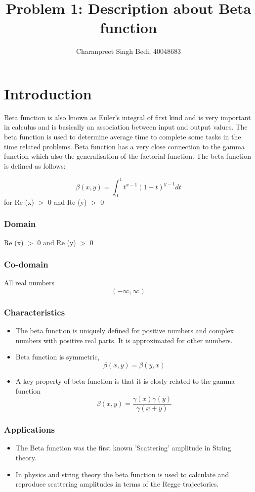 \documentclass[10pt]{article}
\title{Problem 1: Description about Beta function}
\author{Charanpreet Singh Bedi, 40048683}
\date{}
\begin{document}
\maketitle


\section*{Introduction}
Beta function is also known as Euler's integral of first kind and is very important in calculus and is basically an association between input and output values. The beta function is used to determine average time to complete some tasks in the time related problems. Beta function has a very close connection to the gamma function which also the generalisation of the factorial function. The beta function is defined as follows: 


    $$\beta(x,y) =\int_{0}^{1} t^{x-1} (1-t)^{y-1} dt$$
    for Re (x) $>$ 0 and Re (y) $>$ 0
    
\subsubsection*{Domain}
Re (x) $>$ 0 and Re (y) $>$ 0

\subsubsection*{Co-domain}
All real numbers \[ (-\infty,\infty )\]

\subsubsection*{Characteristics}
\begin{itemize}
    \item The beta function is uniquely defined for positive numbers and complex numbers with positive real parts. It is approximated for other numbers.
    \item Beta function is symmetric,$$ \beta(x,y) = \beta(y,x)$$
    \item A key property of beta function is that it is closly related to the gamma function
    $$\beta(x,y) = \frac{\gamma(x)\gamma(y)}{\gamma(x+y)}$$
\end{itemize}

\subsubsection*{Applications}
\begin{itemize}
    \item The Beta function was the first known 'Scattering' amplitude in String theory.
    \item In physics and string theory the beta function is used to calculate and reproduce scattering amplitudes in terms of the Regge trajectories.
\end{itemize}
\end{document}
